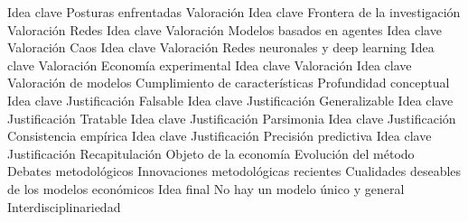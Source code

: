 \documentclass{nuevotema}
\begin{document}
\begin{esquema}[enumerate]
			\3 Idea clave
			\3 Posturas enfrentadas
			\3 Valoración
	\1 
		\2 Idea clave
			\3 Frontera de la investigación
			\3 Valoración
		\2 Redes
			\3 Idea clave
			\3 Valoración
		\2 Modelos basados en agentes
			\3 Idea clave
			\3 Valoración
		\2 Caos
			\3 Idea clave
			\3 Valoración
		\2 Redes neuronales y deep learning
			\3 Idea clave
			\3 Valoración
		\2 Economía experimental
			\3 Idea clave
			\3 Valoración
	\1 
		\2 Idea clave
			\3 Valoración de modelos
			\3 Cumplimiento de características
		\2 Profundidad conceptual
			\3 Idea clave
			\3 Justificación
		\2 Falsable
			\3 Idea clave
			\3 Justificación
		\2 Generalizable
			\3 Idea clave
			\3 Justificación
		\2 Tratable
			\3 Idea clave
			\3 Justificación
		\2 Parsimonia
			\3 Idea clave
			\3 Justificación
		\2 Consistencia empírica
			\3 Idea clave
			\3 Justificación
		\2 Precisión predictiva
			\3 Idea clave
			\3 Justificación
	\1[] 
		\2 Recapitulación
			\3 Objeto de la economía
			\3 Evolución del método
			\3 Debates metodológicos
			\3 Innovaciones metodológicas recientes
			\3 Cualidades deseables de los modelos económicos
		\2 Idea final
			\3 No hay un modelo único y general
			\3 Interdisciplinariedad

\end{esquema}

\esquemalargo
\end{document}
